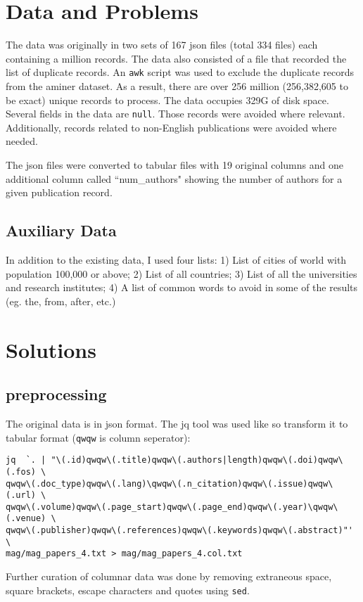 \documentclass{report}
\begin{document}
\section*{Data and Problems}
The data was originally in two sets of 167 json files (total 334 files) each
containing a million records. The data also consisted of a file that recorded
the list of duplicate records. An \texttt{awk} script was used to exclude the
duplicate records from the aminer dataset. As a result, there are over 256
million (256,382,605 to be exact) unique records to process. The data occupies
329G of disk space. Several fields in the data are \texttt{null}. Those records
were avoided where relevant. Additionally, records related to non-English
publications were avoided where needed.

The json files were converted to tabular files with 19 original columns and one
additional column called ``num\_authors" showing the number of authors for a given
publication record.

\subsection*{Auxiliary Data}
In addition to the existing data, I used four lists: 1) List of cities of
world with population 100,000 or above; 2) List of all countries;
3) List of all the universities and research institutes; 4) A list of common
words to avoid in some of the results (eg. the, from, after, etc.)

\section*{Solutions}
\subsection*{preprocessing}
The original data is in json format. The jq tool was used like so transform it to tabular format (\texttt{qwqw} is column seperator):
\begin{verbatim}
jq  `. | "\(.id)qwqw\(.title)qwqw\(.authors|length)qwqw\(.doi)qwqw\(.fos) \
qwqw\(.doc_type)qwqw\(.lang)\qwqw\(.n_citation)qwqw\(.issue)qwqw\(.url) \
qwqw\(.volume)qwqw\(.page_start)qwqw\(.page_end)qwqw\(.year)\qwqw\(.venue) \
qwqw\(.publisher)qwqw\(.references)qwqw\(.keywords)qwqw\(.abstract)"' \
mag/mag_papers_4.txt > mag/mag_papers_4.col.txt
\end{verbatim}
Further curation of columnar data was done by removing extraneous space, square brackets, escape characters and quotes using \texttt{sed}.
\end{document}
